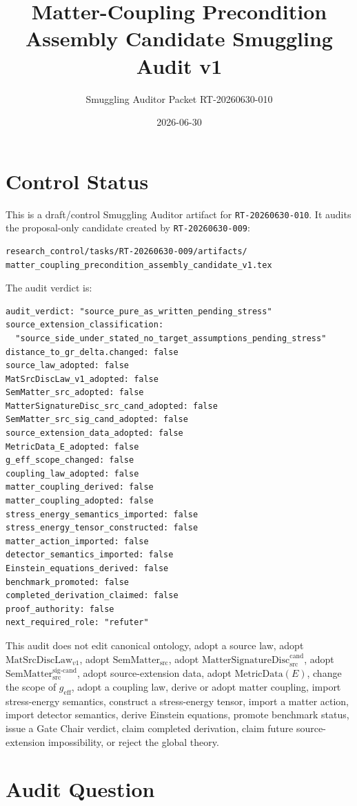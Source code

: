 \documentclass[11pt]{article}
\title{Matter-Coupling Precondition Assembly Candidate Smuggling Audit v1}
\author{Smuggling Auditor Packet RT-20260630-010}
\date{2026-06-30}
\newcommand{\MetricData}{\mathrm{MetricData}}
\newcommand{\geff}{g_{\mathrm{eff}}}
\newcommand{\MatSrcDiscLaw}{\mathrm{MatSrcDiscLaw}_{v1}}
\newcommand{\SemMatterSrc}{\mathrm{SemMatter}_{\mathrm{src}}}
\newcommand{\SemMatterSig}{\mathrm{SemMatter}_{\mathrm{src}}^{\mathrm{sig\text{-}cand}}}
\newcommand{\MatSigDisc}{\mathrm{MatterSignatureDisc}_{\mathrm{src}}^{\mathrm{cand}}}
\begin{document}
\maketitle

\section{Control Status}

This is a draft/control Smuggling Auditor artifact for
\texttt{RT-20260630-010}. It audits the proposal-only candidate created by
\texttt{RT-20260630-009}:

\begin{verbatim}
research_control/tasks/RT-20260630-009/artifacts/
matter_coupling_precondition_assembly_candidate_v1.tex
\end{verbatim}

The audit verdict is:

\begin{verbatim}
audit_verdict: "source_pure_as_written_pending_stress"
source_extension_classification:
  "source_side_under_stated_no_target_assumptions_pending_stress"
distance_to_gr_delta.changed: false
source_law_adopted: false
MatSrcDiscLaw_v1_adopted: false
SemMatter_src_adopted: false
MatterSignatureDisc_src_cand_adopted: false
SemMatter_src_sig_cand_adopted: false
source_extension_data_adopted: false
MetricData_E_adopted: false
g_eff_scope_changed: false
coupling_law_adopted: false
matter_coupling_derived: false
matter_coupling_adopted: false
stress_energy_semantics_imported: false
stress_energy_tensor_constructed: false
matter_action_imported: false
detector_semantics_imported: false
Einstein_equations_derived: false
benchmark_promoted: false
completed_derivation_claimed: false
proof_authority: false
next_required_role: "refuter"
\end{verbatim}

This audit does not edit canonical ontology, adopt a source law, adopt
\(\MatSrcDiscLaw\), adopt \(\SemMatterSrc\), adopt \(\MatSigDisc\), adopt
\(\SemMatterSig\), adopt source-extension data, adopt \(\MetricData(E)\),
change the scope of \(\geff\), adopt a coupling law, derive or adopt matter
coupling, import stress-energy semantics, construct a stress-energy tensor,
import a matter action, import detector semantics, derive Einstein equations,
promote benchmark status, issue a Gate Chair verdict, claim completed
derivation, claim future source-extension impossibility, or reject the global
theory.

\section{Audit Question}
\end{document}
